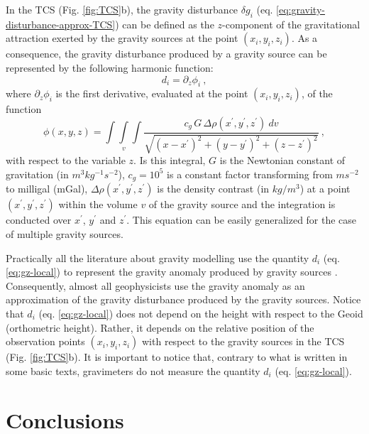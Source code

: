 \documentclass[extra]{gji}
\begin{document}
In the TCS (Fig. \ref{fig:TCS}b),
the gravity disturbance $\delta g_{i}$ (eq. \ref{eq:gravity-disturbance-approx-TCS})
can be defined as the $z$-component of the gravitational attraction exerted by
the gravity sources at the point $(x_{i}, y_{i}, z_{i})$.
As a consequence, the gravity disturbance produced by
a gravity source can be represented by the following harmonic function:
\begin{equation}
d_{i} = \partial_{z} \phi_{i} \: ,
\label{eq:gz-local}
\end{equation}
where $\partial_{z} \phi_{i}$ is the first
derivative, evaluated at the point $(x_{i},y_{i},z_{i})$, of the function
\begin{equation}
\phi(x,y,z) = \int\int\limits_{v}\int
\frac{c_{g} \, G \, \Delta\rho(x^{\prime}, y^{\prime}, z^{\prime}) \: dv}
{\sqrt{(x - x^{\prime})^{2} +
(y - y^{\prime})^{2} + (z - z^{\prime})^{2}}} \: ,
\label{eq:phi}
\end{equation}
with respect to the variable $z$. Is this integral,
$G$ is the Newtonian constant of gravitation (in $m^{3} kg^{-1} s^{-2}$),
$c_{g} = 10^{5}$ is a constant factor transforming from $m s^{-2}$
to milligal (mGal), $\Delta\rho(x^{\prime}, y^{\prime}, z^{\prime})$
is the density contrast (in $kg / m^{3}$) at a point
$(x^{\prime}, y^{\prime}, z^{\prime})$ within
the volume $v$ of the gravity source and the integration is conducted
over $x^{\prime}$, $y^{\prime}$ and $z^{\prime}$.
This equation can be easily generalized for the case
of multiple gravity sources.

Practically all the literature about gravity modelling
use the quantity $d_{i}$ (eq. \ref{eq:gz-local})
to represent the gravity anomaly produced by
gravity sources \citep[e.g.,][]{blakely1996}.
Consequently, almost all geophysicists use the gravity
anomaly as an approximation of the gravity disturbance
produced by the gravity sources. Notice that $d_{i}$
(eq. \ref{eq:gz-local}) does not depend on the
height with respect to the Geoid (orthometric height).
Rather, it depends on the relative position
of the observation points $(x_{i}, y_{i}, z_{i})$ with respect to
the gravity sources in the TCS (Fig. \ref{fig:TCS}b).
It is important to notice that, contrary to what is written in
some basic texts, gravimeters do not measure the quantity
$d_{i}$ (eq. \ref{eq:gz-local}).


\section{Conclusions}
\end{document}
